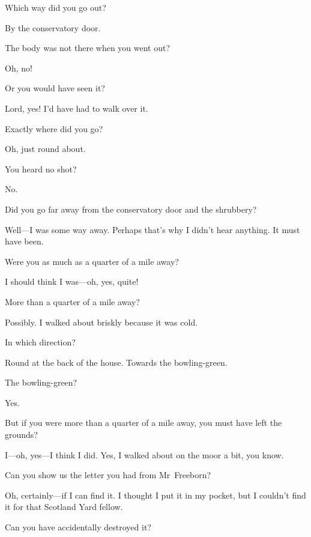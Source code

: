 \begin{dialogue}
 Which way did you go out?

 By the conservatory door.

 The body was not there when you went out?

 Oh, no!

 Or you would have seen it?

 Lord, yes! I'd have had to walk over it.

 Exactly where did you go?

  Oh, just round about.

 You heard no shot?

 No.

 Did you go far away from the conservatory door and the shrubbery?

 Well—I was some way away. Perhaps that's why I didn't hear anything. It must have been.

 Were you as much as a quarter of a mile away?

 I should think I was—oh, yes, quite!

 More than a quarter of a mile away?

 Possibly. I walked about briskly because it was cold.

 In which direction?

  Round at the back of the house.  Towards the bowling-green.

 The bowling-green?

  Yes.

 But if you were more than a quarter of a mile away, you must have left the grounds?

 I—oh, yes—I think I did. Yes, I walked about on the moor a bit, you know.

 Can you show us the letter you had from Mr~Freeborn?

 Oh, certainly—if I can find it. I thought I put it in my pocket, but I couldn't find it for that Scotland Yard fellow.

 Can you have accidentally destroyed it?


\end{dialogue}

